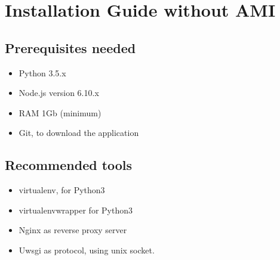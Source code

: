 \section{Installation Guide without AMI}
\subsection{Prerequisites needed}
\begin{itemize}  
\item Python 3.5.x
\item Node.js version 6.10.x
\item RAM 1Gb (minimum)
\item Git, to download the application
\end{itemize}

\subsection{Recommended tools}
\begin{itemize}  
    \item virtualenv, for Python3
    \item virtualenvwrapper for Python3
    \item Nginx as reverse proxy server
    \item Uwsgi as protocol, using unix socket.
\end{itemize}

